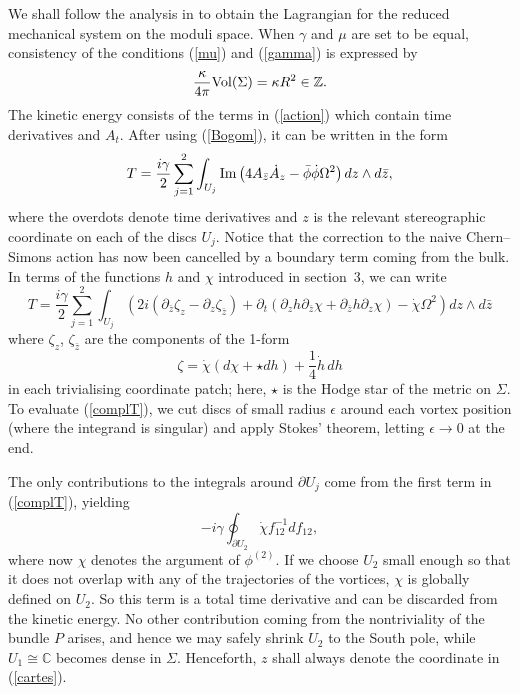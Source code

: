 \documentclass[a4paper,11pt]{article}
\begin{document}
We shall follow the analysis in \cite{Mfovd} to obtain the
Lagrangian for the reduced mechanical system on the moduli space.
When $\gamma$ and $\mu$ are set to be equal,
consistency of the conditions (\ref{mu}) and (\ref{gamma}) is 
expressed by
\begin{equation} \label{consist}
\frac{\kappa}{4\pi} {\rm Vol}(\Sigma)=\kappa R^{2} \in  \mathbb{Z}.
\end{equation}
The kinetic energy consists of the terms in (\ref{action}) which
contain time derivatives and $A_{t}$. After using (\ref{Bogom}), it
can be written in the form
\[
T=\frac{i\gamma}{2} \sum_{j=1}^{2}
\int_{U_{j}} {\rm Im} \left( 4 A_{\bar{z}}\dot{A}_{z}-
\bar{\phi} \dot{\phi} \Omega^{2} \right) dz\wedge d\bar{z},
\]
where the overdots denote time derivatives and $z$ is the relevant
stereographic coordinate on each of the discs $U_{j}$. 
Notice that the correction to the naive 
Chern--Simons action has now been cancelled by a boundary term coming 
from the bulk.
In terms of the functions $h$ and $\chi$ introduced in section~3,
we can write
\begin{equation}\label{complT}
T=\frac{i\gamma}{2}\sum_{j=1}^{2}\int_{U_{j}}\left(
2i(\partial_{\bar{z}}\zeta_{z}-\partial_{z}\zeta_{\bar{z}})
+\partial_{t}
(\partial_{z} h \partial_{\bar{z}} \chi + 
\partial_{\bar{z}}h \partial_{z}\chi)
-\dot{\chi}\Omega^{2}
\right) dz\wedge d\bar{z}
\end{equation}
where $\zeta_{z}$, $\zeta_{\bar{z}}$ are the components of the 1-form
\[
\zeta=\dot{\chi}(d\chi + \star dh)+
\frac{1}{4}\dot{h}\,dh
\]
in each trivialising coordinate patch; here, $\star$ is the Hodge star
of the metric on $\Sigma$.
To evaluate (\ref{complT}), we cut discs of small radius $\epsilon$ 
around each vortex position (where the integrand is singular) and
apply Stokes' theorem, letting $\epsilon\rightarrow 0$ at the end.


The only contributions to the integrals around $\partial U_{j}$ come
from the first term in (\ref{complT}), yielding
\[
-i\gamma\oint_{\partial{U_{2}}}\dot{\chi}f_{12}^{-1}df_{12},
\]
where now $\chi$ denotes the argument of 
$\phi^{(2)}$. If we choose $U_{2}$ small
enough so that it does not overlap with any of the trajectories of the
vortices, $\chi$ is globally defined on $U_{2}$. So this term
is a total time derivative and can be discarded from the kinetic
energy.
No other contribution coming from the nontriviality of the bundle ${P}$
arises, and hence we may safely shrink $U_{2}$ to the South pole, while 
$U_{1}\cong\mathbb{C}$ becomes dense in $\Sigma$. Henceforth, $z$ shall
always denote the coordinate in (\ref{cartes}).
\end{document}
